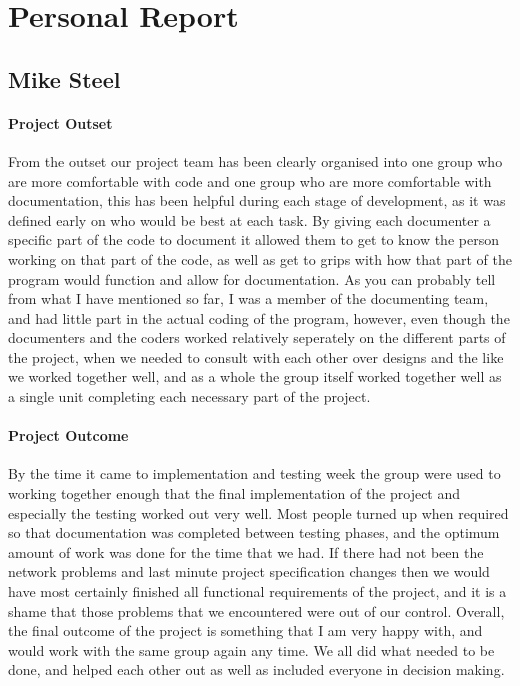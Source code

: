 \documentclass{project}
\begin{document}
\section{Personal Report}
\subsection{Mike Steel}
\paragraph{Project Outset}
From the outset our project team has been clearly organised into one group who are more comfortable with code and one group who are more comfortable with documentation, this has been helpful during each stage of development, as it was defined early on who would be best at each task. By giving each documenter a specific part of the code to document it allowed them to get to know the person working on that part of the code, as well as get to grips with how that part of the program would function and allow for documentation. As you can probably tell from what I have mentioned so far, I was a member of the documenting team, and had little part in the actual coding of the program, however, even though the documenters and the coders worked relatively seperately on the different parts of the project, when we needed to consult with each other over designs and the like we worked together well, and as a whole the group itself worked together well as a single unit completing each necessary part of the project.
\paragraph{Project Outcome}
By the time it came to implementation and testing week the group were used to working together enough that the final implementation of the project and especially the testing worked out very well. Most people turned up when required so that documentation was completed between testing phases, and the optimum amount of work was done for the time that we had. If there had not been the network problems and last minute project specification changes then we would have most certainly finished all functional requirements of the project, and it is a shame that those problems that we encountered were out of our control. Overall, the final outcome of the project is something that I am very happy with, and would work with the same group again any time. We all did what needed to be done, and helped each other out as well as included everyone in decision making.
\end{document}
